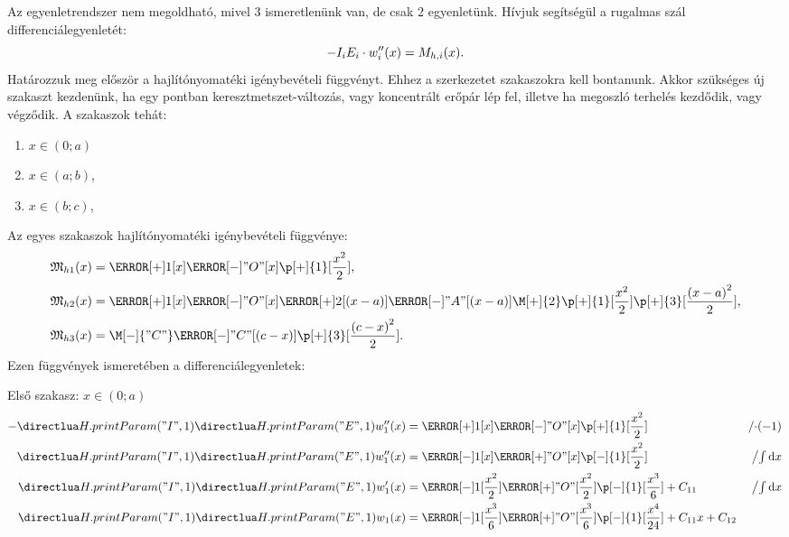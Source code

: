 Az egyenletrendszer nem megoldható, mivel 3 ismeretlenünk van, de csak 2
egyenletünk. Hívjuk segítségül a rugalmas szál differenciálegyenletét:
\begin{equation}
  -I_i E_i \cdot w_i''(x) = M_{h,i}(x)
  \text.
  \label{eq:diffeq-base}
\end{equation}
Határozzuk meg először a hajlítónyomatéki igénybevételi függvényt. Ehhez
a szerkezetet szakaszokra kell bontanunk. Akkor szükséges új szakaszt
kezdenünk, ha egy pontban keresztmetszet-változás, vagy koncentrált erőpár
lép fel, illetve ha megoszló terhelés kezdődik, vagy végződik. A szakaszok
tehát:
\begin{multicols}{3}
  \begin{enumerate}
    \item $x \in (0; a)$
    \item $x \in (a; b)$,
    \item $x \in (b; c)$,
  \end{enumerate}
\end{multicols}
Az egyes szakaszok hajlítónyomatéki igénybevételi függvénye:
\begin{align}
  \spec M_{h1}(x) & =
  \F[+]{1}[x]
  \F[-]{"O"}[x]
  \p[+]{1}[\frac{x^2}{2}]
  \text,
  \\
  \spec M_{h2}(x) & =
  \F[+]{1}[x]
  \F[-]{"O"}[x]
  \F[+]{2}[(x - a)]
  \F[-]{"A"}[(x - a)]
  \M[+]{2}
  \p[+]{1}[\frac{x^2}{2}]
  \p[+]{3}[\frac{\left( x - a \right)^2 }{2}]
  \text,
  \\
  \spec M_{h3}(x) & =
  \M[-]{"C"}
  \F[-]{"C"}[(c - x)]
  \p[+]{3}[\frac{\left( c - x \right)^2}{2}]
  \text.
\end{align}
Ezen függvények ismeretében a differenciálegyenletek:
\newcommand{\op}[1]{&{\textstyle \left/ #1 \right.}}
\newcommand{\opint}{\op{\int \mathrm d x}}


Első szakasz: $x \in (0;a)$
\begin{align}
  - \I{1} \E{1} w_1''(x) & =
  \F[+]{1}[x]
  \F[-]{"O"}[x]
  \p[+]{1}[\frac{x^2}{2}]
  \op{\cdot(-1)}
  \\
  \I{1} \E{1} w_1''(x)   & =
  \F[-]{1}[x]
  \F[+]{"O"}[x]
  \p[-]{1}[\frac{x^2}{2}]
  \opint{}
  \\
  \I{1} \E{1} w_1'(x)    & =
  \F[-]{1}[\frac{x^2}{2}]
  \F[+]{"O"}[\frac{x^2}{2}]
  \p[-]{1}[\frac{x^3}{6}]
  + C_{11}
  \opint{}
  \\
  \I{1} \E{1} w_1(x)     & =
  \F[-]{1}[\frac{x^3}{6}]
  \F[+]{"O"}[\frac{x^3}{6}]
  \p[-]{1}[\frac{x^4}{24}]
  + C_{11} x
  + C_{12}
\end{align}

